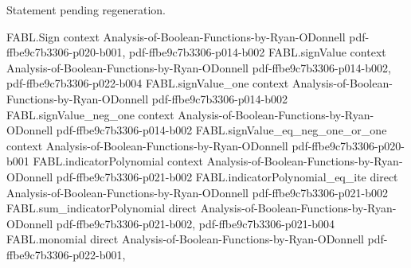 \begin{theorem}
\label{FABL.fourierCoeff_eq_int_mul_global_scale_of_card_le}
\leanok
{}
Statement pending regeneration.
\end{theorem}

\begin{theorem}
\label{FABL.isFourierGranular_signValue_of_fourierDegree_le}
\leanok
{}
\proofstep
  {FABL.Sign}
  {context}
  {Analysis-of-Boolean-Functions-by-Ryan-ODonnell}
  {pdf-ffbe9c7b3306-p020-b001,
    pdf-ffbe9c7b3306-p014-b002}
\proofstep
  {FABL.signValue}
  {context}
  {Analysis-of-Boolean-Functions-by-Ryan-ODonnell}
  {pdf-ffbe9c7b3306-p014-b002,
    pdf-ffbe9c7b3306-p022-b004}
\proofstep
  {FABL.signValue_one}
  {context}
  {Analysis-of-Boolean-Functions-by-Ryan-ODonnell}
  {pdf-ffbe9c7b3306-p014-b002}
\proofstep
  {FABL.signValue_neg_one}
  {context}
  {Analysis-of-Boolean-Functions-by-Ryan-ODonnell}
  {pdf-ffbe9c7b3306-p014-b002}
\proofstep
  {FABL.signValue_eq_neg_one_or_one}
  {context}
  {Analysis-of-Boolean-Functions-by-Ryan-ODonnell}
  {pdf-ffbe9c7b3306-p020-b001}
\proofstep
  {FABL.indicatorPolynomial}
  {context}
  {Analysis-of-Boolean-Functions-by-Ryan-ODonnell}
  {pdf-ffbe9c7b3306-p021-b002}
\proofstep
  {FABL.indicatorPolynomial_eq_ite}
  {direct}
  {Analysis-of-Boolean-Functions-by-Ryan-ODonnell}
  {pdf-ffbe9c7b3306-p021-b002}
\proofstep
  {FABL.sum_indicatorPolynomial}
  {direct}
  {Analysis-of-Boolean-Functions-by-Ryan-ODonnell}
  {pdf-ffbe9c7b3306-p021-b002,
    pdf-ffbe9c7b3306-p021-b004}
\proofstep
  {FABL.monomial}
  {direct}
  {Analysis-of-Boolean-Functions-by-Ryan-ODonnell}
  {pdf-ffbe9c7b3306-p022-b001,
}
\end{theorem}
